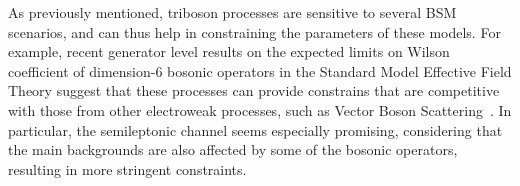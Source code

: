 As previously mentioned, triboson processes are sensitive to several BSM scenarios,
and can thus help in constraining the parameters of these models.
For example, recent generator level results on the expected limits
on Wilson coefficient of dimension-6 bosonic operators in the Standard Model Effective Field Theory
suggest that these processes can provide constrains that are competitive with those from other electroweak processes,
such as Vector Boson Scattering~\cite{Bellan_2023}.
In particular, the semileptonic channel seems especially promising, considering that the main backgrounds are also affected by some of the bosonic operators,
resulting in more stringent constraints.
